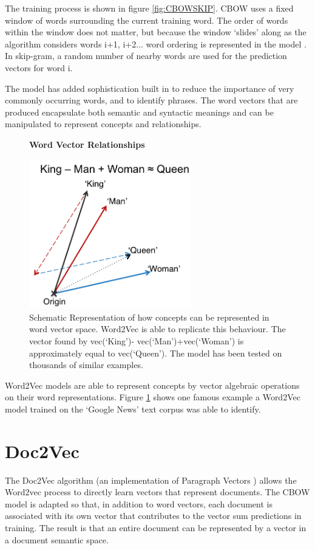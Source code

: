 The training process is shown in figure \ref{fig:CBOWSKIP}. CBOW uses a fixed window of words surrounding the current training word. The order of words within the window does not matter, but because the window `slides' along as the algorithm considers words i+1, i+2... word ordering is represented in the model . In skip-gram, a random number of nearby words are used for the prediction vectors for word i. 

The model has added sophistication built in to reduce the importance of very commonly occurring words, and to identify phrases. The word vectors that are produced encapsulate both semantic and syntactic meanings and can be manipulated to represent concepts and relationships.
\begin{figure}[H]
    \centering
    \textbf{Word Vector Relationships}\par\medskip
    \includegraphics[height=6.5cm]{Natural_Language_Processing/KINGQUEEN.png}
    \caption{Schematic Representation of how concepts can be represented in word vector space. Word2Vec is able to replicate this behaviour. The vector found by vec(‘King’)- vec(‘Man’)+vec(‘Woman’) is approximately equal to vec(‘Queen’). The model has been tested on thousands of similar examples\cite{word2vec2}\cite{word2veckingqueen}.}
     \label{fig:KINGQUEEN}
\end{figure}
Word2Vec models are able to represent concepts by vector algebraic operations on their word representations. Figure \ref{fig:KINGQUEEN} shows one famous example a Word2Vec model trained on the `Google News' text corpus was able to identify. 

\section{Doc2Vec}
The Doc2Vec algorithm \cite{gensim}(an implementation of Paragraph Vectors \cite{doc2vec}) allows the Word2vec process to directly learn vectors that represent documents. The CBOW model is adapted so that, in addition to word vectors, each document is associated with its own vector that contributes to the vector sum predictions in training. The result is that an entire document can be represented by a vector in a document semantic space.

